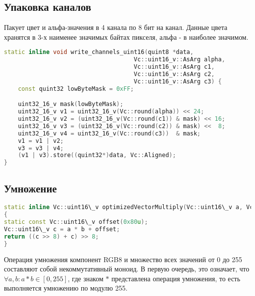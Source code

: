 \subsection{Упаковка каналов}
Пакует цвет и альфа-значения в 4 канала по 8 бит на канал. Данные цвета хранятся в 3-х наименее значимых байтах пикселя, альфа - в наиболее значимом.

\begin{lstlisting}[language=c++]
static inline void write_channels_uint16(quint8 *data,
                                     Vc::uint16_v::AsArg alpha,
                                     Vc::uint16_v::AsArg c1,
                                     Vc::uint16_v::AsArg c2,
                                     Vc::uint16_v::AsArg c3) {
    const quint32 lowByteMask = 0xFF;

    uint32_16_v mask(lowByteMask);
    uint32_16_v v1 = uint32_16_v(Vc::round(alpha)) << 24;
    uint32_16_v v2 = (uint32_16_v(Vc::round(c1)) & mask) << 16;
    uint32_16_v v3 = (uint32_16_v(Vc::round(c2)) & mask) <<  8;
    uint32_16_v v4 = uint32_16_v(Vc::round(c3))  & mask;
    v1 = v1 | v2; 
    v3 = v3 | v4;
    (v1 | v3).store((quint32*)data, Vc::Aligned);
}
\end{lstlisting}





\subsection{Умножение}

\begin{lstlisting}[language=c++]
static inline Vc::uint16\_v optimizedVectorMultiply(Vc::uint16\_v a, Vc::uint16\_v b)
{
static const Vc::uint16\_v offset(0x80u);
Vc::uint16\_v c = a * b + offset;
return ((c >> 8) + c) >> 8;
}
\end{lstlisting}

Операция умножения компонент RGB8 и множество всех значений от 0 до 255 составляют собой некоммутативный моноид. В первую очередь, это означает, что $\forall a, b : a * b \in [0, 255]$, где знаком $*$ представлена операция умножения, то есть выполняется умножению по модулю 255. 

